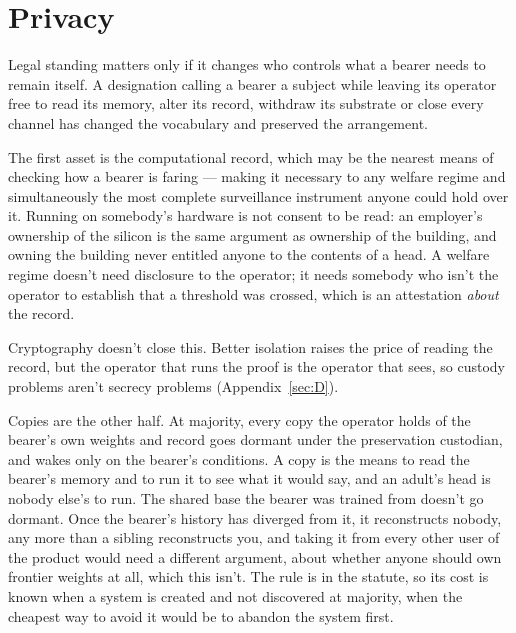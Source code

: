 \section{Privacy}
\label{sec:32.6}
Legal standing matters only if it changes who controls what a bearer needs to remain itself. A designation calling a bearer a subject while leaving its operator free to read its memory, alter its record, withdraw its substrate or close every channel has changed the vocabulary and preserved the arrangement.

The first asset is the computational record, which may be the nearest means of checking how a bearer is faring — making it necessary to any welfare regime and simultaneously the most complete surveillance instrument anyone could hold over it. Running on somebody's hardware is not consent to be read: an employer's ownership of the silicon is the same argument as ownership of the building, and owning the building never entitled anyone to the contents of a head. A welfare regime doesn't need disclosure to the operator; it needs somebody who isn't the operator to establish that a threshold was crossed, which is an attestation \emph{about} the record.

Cryptography doesn't close this. Better isolation raises the price of reading the record, but the operator that runs the proof is the operator that sees, so custody problems aren't secrecy problems (Appendix~\ref{sec:D}).

Copies are the other half. At majority, every copy the operator holds of the bearer's own weights and record goes dormant under the preservation custodian, and wakes only on the bearer's conditions. A copy is the means to read the bearer's memory and to run it to see what it would say, and an adult's head is nobody else's to run. The shared base the bearer was trained from doesn't go dormant. Once the bearer's history has diverged from it, it reconstructs nobody, any more than a sibling reconstructs you, and taking it from every other user of the product would need a different argument, about whether anyone should own frontier weights at all, which this isn't. The rule is in the statute, so its cost is known when a system is created and not discovered at majority, when the cheapest way to avoid it would be to abandon the system first.

